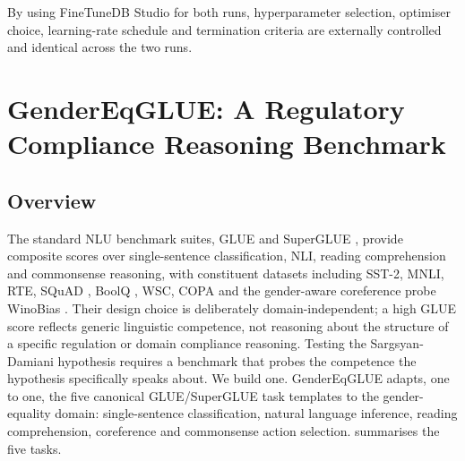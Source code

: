 \documentclass[pdflatex, sn-apa]{sn-jnl}%
\theoremstyle{thmstyleone}%
\theoremstyle{thmstyletwo}%
\theoremstyle{thmstylethree}%
\begin{document}
By using FineTuneDB Studio for both runs, hyperparameter selection, optimiser
choice, learning-rate schedule and termination criteria are externally controlled
and identical across the two runs.

\FloatBarrier
\section{GenderEqGLUE: A Regulatory Compliance Reasoning Benchmark}
\label{sec:benchmark}

\subsection{Overview}
\label{sec:bench:overview}

The standard NLU benchmark suites, GLUE \citep{wang2018glue} and SuperGLUE
\citep{wang2019superglue}, provide composite scores over single-sentence
classification, NLI, reading comprehension and commonsense reasoning, with
constituent datasets including SST-2, MNLI, RTE, SQuAD
\citep{rajpurkar2016squad}, BoolQ \citep{clark2019boolq}, WSC, COPA
\citep{roemmele2011copa} and the gender-aware coreference probe WinoBias
\citep{zhao2018winobias}. Their design choice is deliberately domain-independent;
a high GLUE score reflects generic linguistic competence, not reasoning about the
structure of a specific regulation or domain compliance reasoning. Testing the
Sargsyan-Damiani hypothesis requires a benchmark that probes the competence the
hypothesis specifically speaks about. We build one. GenderEqGLUE adapts, one to
one, the five canonical GLUE/SuperGLUE task templates to the gender-equality
domain: single-sentence classification, natural language inference, reading
comprehension, coreference and commonsense action selection. 
summarises the five tasks.
\end{document}
